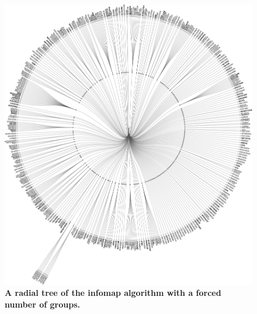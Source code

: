   \begin{figure}[H]
    \centering
    \includegraphics[width=\textwidth]{fig/manygroups.pdf}
    \caption{\textbf{A radial tree of the infomap algorithm with a forced number of groups.} }
        \label{fig:im200}
  \end{figure}




















%
